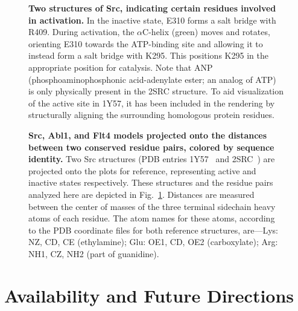 \documentclass[10pt,letterpaper]{article}
\begin{document}
\begin{figure}[h]

    \caption{{\bf Two structures of Src, indicating certain residues involved in activation.}
    In the inactive state, E310 forms a salt bridge with R409.
    During activation, the $\alpha$C-helix (green) moves and rotates, orienting E310 towards the ATP-binding site and allowing it to instead form a salt bridge with K295.
    This positions K295 in the appropriate position for catalysis.
    Note that ANP (phosphoaminophosphonic acid-adenylate ester; an analog of ATP) is only physically present in the 2SRC structure.
    To aid visualization of the active site in 1Y57, it has been included in the rendering by structurally aligning the surrounding homologous protein residues.
  }
  \label{figure:src-ref-structures}
\end{figure}

\begin{figure}[h]


    \caption{{\bf Src, Abl1, and Flt4 models projected onto the distances between two conserved residue pairs, colored by sequence identity.}
    Two Src structures (PDB entries 1Y57~\cite{cowan-jacob:2005:1y57} and 2SRC~\cite{xu:1999:2src}) are projected onto the plots for reference, representing active and inactive states respectively.
    These structures and the residue pairs analyzed here are depicted in Fig.~\ref{figure:src-ref-structures}.
    Distances are measured between the center of masses of the three terminal sidechain heavy atoms of each residue.
    The atom names for these atoms, according to the PDB coordinate files for both reference structures, are---Lys: NZ, CD, CE (ethylamine); Glu: OE1, CD, OE2 (carboxylate); Arg: NH1, CZ, NH2 (part of guanidine).
    }
  \label{figure:pair-distances}
\end{figure}

\section*{Availability and Future Directions}
\label{section:availability}
\end{document}
